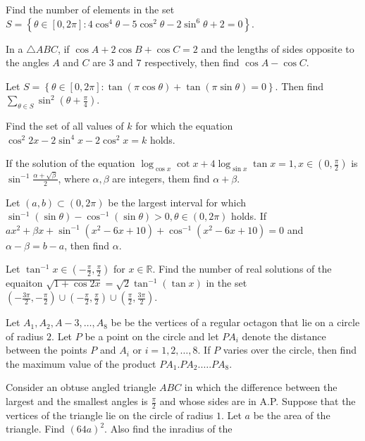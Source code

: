   \startplacefigure
    \externalfigure[17_32.pdf]
  \stopplacefigure
\item Find the number of elements in the set $S = \left\{\theta\in[0, 2\pi]: 4\cos^4\theta - 5\cos^{2}\theta -
  2\sin^6\theta + 2 = 0\right\}$.
\item In a $\triangle ABC$, if $\cos A + 2\cos B + \cos C = 2$ and the lengths of sides opposite to the
  angles $A$ and $C$ are $3$ and $7$ respectively, then find $\cos A - \cos C$.
\item Let $S = \left\{\theta\in[0, 2\pi]: \tan(\pi\cos\theta) + \tan(\pi\sin\theta) = 0\right\}$. Then find
  $\displaystyle\sum_{\theta\in S}\sin^{2}\left(\theta + \frac{\pi}{4}\right)$.
\item Find the set of all values of $k$ for which the equation $\cos^{2}2x - 2\sin^4x - 2\cos^{2}x = k$
  holds.
\item If the solution of the equation $\log_{\cos x}\cot x + 4\log_{\sin x}\tan x = 1,
  x\in\left(0, \frac{\pi}{2}\right)$ is $\sin^{-1}\frac{\alpha + \sqrt{\beta}}{2}$, where $\alpha, \beta$
  are integers, them find $\alpha + \beta$.
\item Let $(a, b)\subset(0, 2\pi)$ be the largest interval for which $\sin^{-1}(\sin\theta)
  - \cos^{-1}(\sin\theta) > 0, \theta\in(0, 2\pi)$ holds. If $ax^{2} + \beta x + \sin^{-1}\left(x^{2} - 6x
  + 10\right) + \cos^{-1}\left(x^{2} - 6x + 10\right) = 0$ and $\alpha - \beta = b - a$, then find $\alpha$.
\item Let $\tan^{-1}x\in\left(-\frac{\pi}{2}, \frac{\pi}{2}\right)$ for $x\in\mathbb{R}$. Find the number of
  real solutions of the equaiton $\sqrt{1 + \cos2x} = \sqrt{2}\tan^{-1}(\tan x)$ in the set
  $\left(-\frac{3\pi}{2},
  -\frac{\pi}{2}\right)\cup\left(-\frac{\pi}{2}, \frac{\pi}{2}\right)\cup \left(\frac{\pi}{2},
  \frac{3\pi}{2}\right)$.
\item Let $A_1, A_2, A-3, \ldots, A_8$ be be the vertices of a regular octagon that lie on a circle of
  radius $2$. Let $P$ be a point on the circle and let $PA_i$ denote the distance between the points $P$ and
  $A_i$ or $i = 1,2,\ldots,8$. If $P$ varies over the circle, then find the maximum value of the product
  $PA_1.PA_2.\ldots.PA_8$.
\item Consider an obtuse angled triangle $ABC$ in which the difference between the largest and the smallest
  angles is $\frac{\pi}{2}$ and whose sides are in A.P. Suppose that the vertices of the triangle lie on the
  circle of radius $1$. Let $a$ be the area of the triangle. Find $(64a)^{2}$. Also find the inradius of the
